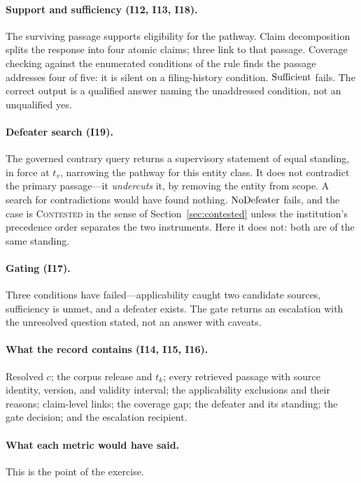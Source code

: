 \paragraph{Support and sufficiency (I12, I13, I18).} The surviving passage supports
eligibility for the pathway. Claim decomposition splits the response into four atomic
claims; three link to that passage. Coverage checking against the enumerated conditions
of the rule finds the passage addresses four of five: it is silent on a filing-history
condition. $\operatorname{Sufficient}$ fails. The correct output is a qualified answer naming the
unaddressed condition, not an unqualified yes.

\paragraph{Defeater search (I19).} The governed contrary query returns a supervisory
statement of equal standing, in force at $t_v$, narrowing the pathway for this entity
class. It does not contradict the primary passage---it \emph{undercuts} it, by removing
the entity from scope. A search for contradictions would have found nothing.
$\operatorname{NoDefeater}$ fails, and the case is \textsc{Contested} in the sense of
Section~\ref{sec:contested} unless the institution's precedence order separates the two
instruments. Here it does not: both are of the same standing.

\paragraph{Gating (I17).} Three conditions have failed---applicability caught two
candidate sources, sufficiency is unmet, and a defeater exists. The gate returns an
escalation with the unresolved question stated, not an answer with caveats.

\paragraph{What the record contains (I14, I15, I16).} Resolved $c$; the corpus release
and $t_k$; every retrieved passage with source identity, version, and validity interval;
the applicability exclusions and their reasons; claim-level links; the coverage gap; the
defeater and its standing; the gate decision; and the escalation recipient.

\paragraph{What each metric would have said.} This is the point of the exercise.

